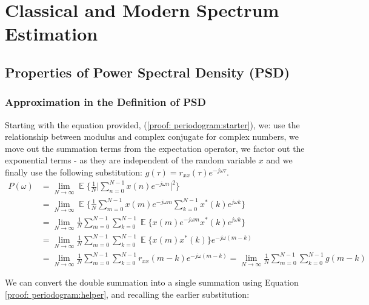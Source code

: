 \documentclass[12pt]{article}
\date{April 2019}
\DeclareMathOperator*{\E}{\mathbb{E}}
\begin{document}


\newpage
\tableofcontents

\newpage
\section{Classical and Modern Spectrum Estimation}
	\subsection{Properties of Power Spectral Density (PSD)} \label{sec: 1-1-prop-PSD}
	
	\subsubsection{Approximation in the Definition of PSD} \label{sec: 1-1a-prop-PSD}
	Starting with the equation provided, (\ref{proof: periodogram:starter}), we: use the relationship between modulus and complex conjugate for complex numbers, we move out the summation terms from the expectation operator, we factor out the exponential terms - as they are independent of the random variable $x$ and we finally use the following substitution:  $g(\tau) = r_{xx}(\tau) e^{-j\omega\tau}$.
	\begin{align}
		P(\omega)   & =\lim_{N\to\infty} \E \bigg\{ \frac{1}{N} \bigg| \sum_{n=0}^{N-1} x(n) e^{-j\omega n} \bigg|^{2} \bigg\}
		\label{proof: periodogram:starter}\\
		& = \lim_{N\to\infty} \E \bigg\{\frac{1}{N}
		\sum_{m=0}^{N-1} x(m) e^{-j\omega m} \sum_{k=0}^{N-1} x^{*}(k) e^{j\omega k} \bigg\}\nonumber\\
		& = \lim_{N\to\infty} \frac{1}{N}
		\sum_{m=0}^{N-1} \sum_{k=0}^{N-1} \E \bigg\{ x(m) e^{-j\omega m} x^{*}(k) e^{j\omega k} \bigg\}\nonumber\\
		& = \lim_{N\to\infty} \frac{1}{N}
		\sum_{m=0}^{N-1} \sum_{k=0}^{N-1} \E \bigg\{ x(m) x^{*}(k) \bigg\} e^{-j\omega(m-k)} \nonumber\\
		& = \lim_{N\to\infty} \frac{1}{N}
		\sum_{m=0}^{N-1} \sum_{k=0}^{N-1} r_{xx}(m-k) e^{-j\omega(m-k)}
		= \lim_{N\to\infty} \frac{1}{N}
		\sum_{m=0}^{N-1} \sum_{k=0}^{N-1} g(m-k)
		\label{proof: periodogram}
	\end{align}
	
	We can convert the double summation into a single summation using Equation \ref{proof: periodogram:helper}, and recalling the earlier substitution:
	
\end{document}
